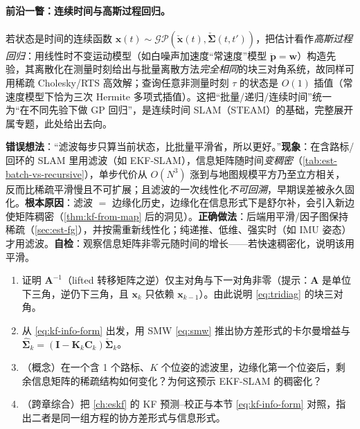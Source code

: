 \paragraph{前沿一瞥：连续时间与高斯过程回归。}
若状态是时间的连续函数 $\mathbf{x}(t)\sim\mathcal{GP}(\check{\mathbf{x}}(t),\check{\boldsymbol{\Sigma}}(t,t'))$，把估计看作\emph{高斯过程回归}：用线性时不变运动模型（如白噪声加速度“常速度”模型 $\ddot{\mathbf{p}}=\mathbf{w}$）构造先验，其离散化在测量时刻给出与批量离散方法\emph{完全相同}的块三对角系统，故同样可用稀疏 Cholesky/RTS 高效解；查询任意非测量时刻 $\tau$ 的状态是 $O(1)$ 插值（常速度模型下恰为三次 Hermite 多项式插值）\cite{barfoot2024state}。这把“批量/递归/连续时间”统一为“在不同先验下做 GP 回归”，是连续时间 SLAM（STEAM）的基础，完整展开属专题，此处给出去向。

\begin{pitfall}
\textbf{错误想法}：“滤波每步只算当前状态，比批量平滑省，所以更好。”\textbf{现象}：在含路标/回环的 SLAM 里用滤波（如 EKF-SLAM），信息矩阵随时间\emph{变稠密}（\cref{tab:est-batch-vs-recursive}），单步代价从 $O(N^3)$ 涨到与地图规模平方乃至立方相关，反而比稀疏平滑慢且不可扩展；且滤波的一次线性化\emph{不可回溯}，早期误差被永久固化。\textbf{根本原因}：滤波 $=$ 边缘化历史，边缘化在信息形式下是舒尔补，会引入新边使矩阵稠密（\cref{thm:kf-from-map} 后的洞见）。\textbf{正确做法}：后端用平滑/因子图保持稀疏（\cref{sec:est-fg}），并按需重新线性化；纯递推、低维、强实时（如 IMU 姿态）才用滤波。\textbf{自检}：观察信息矩阵非零元随时间的增长——若快速稠密化，说明该用平滑。
\end{pitfall}

\begin{practice}
\begin{enumerate}
  \item 证明 $\mathbf{A}^{-1}$（lifted 转移矩阵之逆）仅主对角与下一对角非零（提示：$\mathbf{A}$ 是单位下三角，逆仍下三角，且 $\mathbf{x}_k$ 只依赖 $\mathbf{x}_{k-1}$）。由此说明 \cref{eq:tridiag} 的块三对角。
  \item 从 \cref{eq:kf-info-form} 出发，用 SMW \cref{eq:smw} 推出协方差形式的卡尔曼增益与 $\hat{\boldsymbol{\Sigma}}_k=(\mathbf{I}-\mathbf{K}_k\mathbf{C}_k)\check{\boldsymbol{\Sigma}}_k$。
  \item （概念）在一个含 1 个路标、$K$ 个位姿的滤波里，边缘化第一个位姿后，剩余信息矩阵的稀疏结构如何变化？为何这预示 EKF-SLAM 的稠密化？
  \item （跨章综合）把 \cref{ch:eskf} 的 KF 预测–校正与本节 \cref{eq:kf-info-form} 对照，指出二者是同一组方程的协方差形式与信息形式。
\end{enumerate}
\end{practice}

